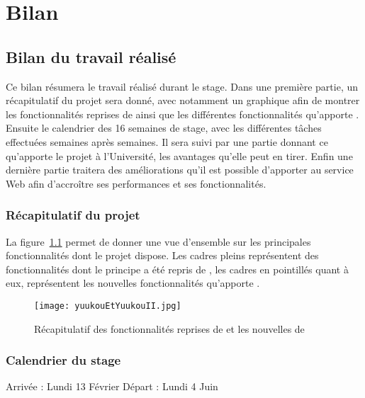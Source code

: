 \chapter{Bilan}

\section{Bilan du travail r\'ealis\'e}

Ce bilan r\'esumera le travail r\'ealis\'e durant le stage.
Dans une premi\`ere partie, un r\'ecapitulatif du projet sera donn\'e, avec notamment un graphique afin de montrer les fonctionnalit\'es reprises de {\Yuukou} ainsi que les diff\'erentes fonctionnalit\'es qu'apporte {\YuukouII}.
Ensuite le calendrier des 16 semaines de stage, avec les diff\'erentes t\^aches effectu\'ees semaines apr\`es semaines.
Il sera suivi par une partie donnant ce qu'apporte le projet \`a l'Universit\'e, les avantages qu'elle peut en tirer.
Enfin une derni\`ere partie traitera des am\'eliorations qu'il est possible d'apporter au service Web afin d'accro\^itre ses performances et ses fonctionnalit\'es.

\subsection{R\'ecapitulatif du projet}

La figure~\ref{figure:yuukouEtYuukouII} permet de donner une vue d'ensemble sur les principales fonctionnalit\'es dont le projet dispose.
Les cadres pleins repr\'esentent des fonctionnalit\'es dont le principe a \'et\'e repris de {\Yuukou}, les cadres en pointill\'es quant \`a eux, repr\'esentent les nouvelles fonctionnalit\'es qu'apporte \YuukouII.

\begin{figure}[!ht]
	\centering
	\texttt{[image: yuukouEtYuukouII.jpg]}
	\caption{R\'ecapitulatif des fonctionnalit\'es reprises de {\Yuukou} et les nouvelles de \YuukouII}
	\label{figure:yuukouEtYuukouII}

\end{figure}

\subsection{Calendrier du stage}
Arriv\'ee : Lundi 13 F\'evrier
D\'epart : Lundi 4 Juin


